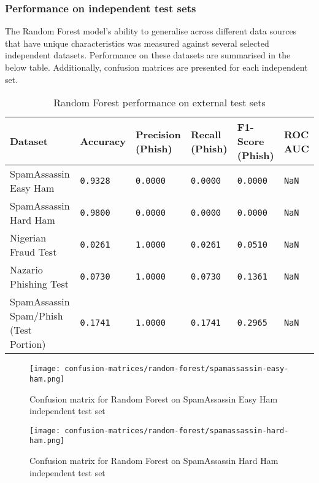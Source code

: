 
\subsubsection*{Performance on independent test sets}
The Random Forest model's ability to generalise across different data sources that have unique characteristics was measured against several selected independent datasets. Performance on these datasets are summarised in the below table. Additionally, confusion matrices are presented for each independent set.

\begin{table}[h]
\centering
\begin{tabularx}{\textwidth}{|X|X|X|X|X|X|}
\hline
\textbf{Dataset} & \textbf{Accuracy} & \textbf{Precision (Phish)} & \textbf{Recall (Phish)} & \textbf{F1-Score (Phish)} & \textbf{ROC AUC} \\
\hline
SpamAssassin Easy Ham & \texttt{0.9328} & \texttt{0.0000} & \texttt{0.0000} & \texttt{0.0000} & \texttt{NaN} \\
\hline
SpamAssassin Hard Ham & \texttt{0.9800} & \texttt{0.0000} & \texttt{0.0000} & \texttt{0.0000} & \texttt{NaN} \\
\hline
Nigerian Fraud Test & \texttt{0.0261} & \texttt{1.0000} & \texttt{0.0261} & \texttt{0.0510} & \texttt{NaN} \\
\hline
Nazario Phishing Test & \texttt{0.0730} & \texttt{1.0000} & \texttt{0.0730} & \texttt{0.1361} & \texttt{NaN} \\
\hline
SpamAssassin Spam/Phish (Test Portion) & \texttt{0.1741} & \texttt{1.0000} & \texttt{0.1741} & \texttt{0.2965} & \texttt{NaN} \\
\hline
\end{tabularx}
\caption{Random Forest performance on external test sets}
\end{table}

\begin{figure}[H]
  \begin{center}
    \texttt{[image: confusion-matrices/random-forest/spamassassin-easy-ham.png]}
    \caption{Confusion matrix for Random Forest on SpamAssassin Easy Ham independent test set}
  \end{center}
\end{figure}

\begin{figure}[H]
  \begin{center}
    \texttt{[image: confusion-matrices/random-forest/spamassassin-hard-ham.png]}
    \caption{Confusion matrix for Random Forest on SpamAssassin Hard Ham independent test set}
  \end{center}
\end{figure}

